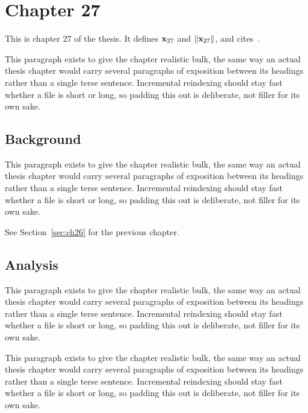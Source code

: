 \section{Chapter 27}
\label{sec:ch27}

This is chapter 27 of the thesis. It defines $\mathbf{x}_{27}$ and $\lVert \mathbf{x}_{27} \rVert$, and cites~\cite{ref1}.

This paragraph exists to give the chapter realistic bulk, the same way an actual thesis chapter would carry several paragraphs of exposition between its headings rather than a single terse sentence. Incremental reindexing should stay fast whether a file is short or long, so padding this out is deliberate, not filler for its own sake.

\subsection{Background}
\label{sec:ch27:background}

This paragraph exists to give the chapter realistic bulk, the same way an actual thesis chapter would carry several paragraphs of exposition between its headings rather than a single terse sentence. Incremental reindexing should stay fast whether a file is short or long, so padding this out is deliberate, not filler for its own sake.

See Section~\ref{sec:ch26} for the previous chapter.

\subsection{Analysis}
\label{sec:ch27:analysis}

This paragraph exists to give the chapter realistic bulk, the same way an actual thesis chapter would carry several paragraphs of exposition between its headings rather than a single terse sentence. Incremental reindexing should stay fast whether a file is short or long, so padding this out is deliberate, not filler for its own sake.

This paragraph exists to give the chapter realistic bulk, the same way an actual thesis chapter would carry several paragraphs of exposition between its headings rather than a single terse sentence. Incremental reindexing should stay fast whether a file is short or long, so padding this out is deliberate, not filler for its own sake.

